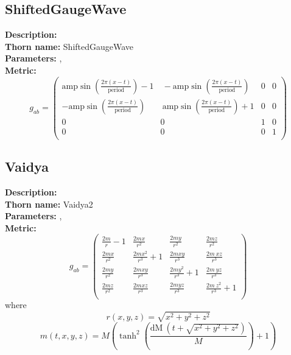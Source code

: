 \subsection{ShiftedGaugeWave}
{\bf Description:}   \\
{\bf Thorn name:} ShiftedGaugeWave \\
{\bf Parameters:} ,  \\
{\bf Metric:} \\
\begin{equation}
g_{ab} =
\left(
\begin{array}{cccc}
 \text{amp} \sin \left(\frac{2 \pi  (x-t)}{\text{period}}\right)-1 & \
-\text{amp} \sin \left(\frac{2 \pi  (x-t)}{\text{period}}\right) & 0 & 0 \\
 -\text{amp} \sin \left(\frac{2 \pi  (x-t)}{\text{period}}\right) & \
\text{amp} \sin \left(\frac{2 \pi  (x-t)}{\text{period}}\right)+1 & 0 & 0 \\
 0 & 0 & 1 & 0 \\
 0 & 0 & 0 & 1 \\
\end{array}
\right)
\end{equation}


\subsection{Vaidya}
{\bf Description:}   \\
{\bf Thorn name:} Vaidya2 \\
{\bf Parameters:} ,  \\
{\bf Metric:} \\
\begin{equation}
g_{ab} =
\left(
\begin{array}{cccc}
 \frac{2 m}{r}-1 & \frac{2 m x}{r^2} & \frac{2 m y}{r^2} & \frac{2 m z}{r^2} \
\\
 \frac{2 m x}{r^2} & \frac{2 m x^2}{r^3}+1 & \frac{2 m x y}{r^3} & \frac{2 m \
x z}{r^3} \\
 \frac{2 m y}{r^2} & \frac{2 m x y}{r^3} & \frac{2 m y^2}{r^3}+1 & \frac{2 m \
y z}{r^3} \\
 \frac{2 m z}{r^2} & \frac{2 m x z}{r^3} & \frac{2 m y z}{r^3} & \frac{2 m \
z^2}{r^3}+1 \\
\end{array}
\right)
\end{equation}
where
\begin{equation}
r(x,y,z)=\sqrt{x^2+y^2+z^2}
\end{equation}
\begin{equation}
m(t,x,y,z)=M \left(\tanh ^2\left(\frac{\text{dM} \
\left(t+\sqrt{x^2+y^2+z^2}\right)}{M}\right)+1\right)
\end{equation}


